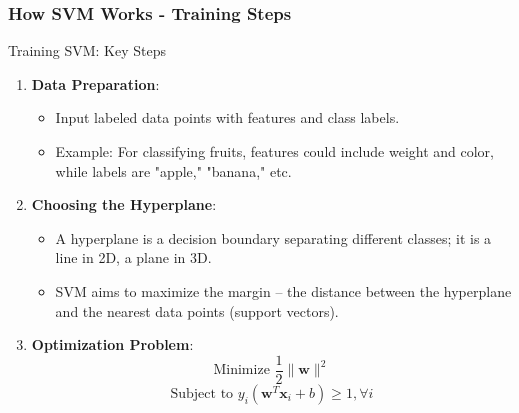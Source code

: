 \documentclass[aspectratio=169]{beamer}
\begin{document}
\begin{frame}[fragile]
    \frametitle{How SVM Works - Training Steps}
    \begin{block}{Training SVM: Key Steps}
        \begin{enumerate}
            \item \textbf{Data Preparation}:
            \begin{itemize}
                \item Input labeled data points with features and class labels.
                \item Example: For classifying fruits, features could include weight and color, while labels are "apple," "banana," etc.
            \end{itemize}
            
            \item \textbf{Choosing the Hyperplane}:
            \begin{itemize}
                \item A hyperplane is a decision boundary separating different classes; it is a line in 2D, a plane in 3D.
                \item SVM aims to maximize the margin – the distance between the hyperplane and the nearest data points (support vectors).
            \end{itemize}
            
            \item \textbf{Optimization Problem}:
            \begin{equation}
            \text{Minimize } \frac{1}{2} \| \mathbf{w} \|^2
            \end{equation}
            \begin{equation}
            \text{Subject to } y_i(\mathbf{w}^T \mathbf{x}_i + b) \geq 1, \forall i
            \end{equation}
        \end{enumerate}
    \end{block}
\end{frame}
\end{document}

